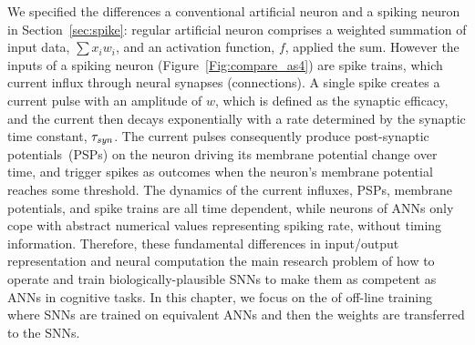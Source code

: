 	We \DIFdelbegin {}\DIFdelend specified the differences \DIFdelbegin {}\DIFdelend \DIFaddbegin {}\DIFaddend a conventional artificial neuron and a spiking neuron in Section~\ref{sec:spike}: \DIFaddbegin {}\DIFaddend regular artificial neuron comprises a weighted summation of input data, $\sum x_i w_i$, and an activation function, $f$, applied \DIFdelbegin {}\DIFdelend \DIFaddbegin {}\DIFaddend the sum.
	However the inputs of a spiking neuron (Figure~\ref{Fig:compare_as4}) are spike trains, which \DIFdelbegin {}\DIFdelend \DIFaddbegin {}\DIFaddend current influx through neural synapses (connections).
	A single spike creates a current pulse with an amplitude of $w$, which is defined as the synaptic efficacy, and the current then decays exponentially with a \DIFdelbegin {}\DIFdelend \DIFaddbegin {}\DIFaddend rate determined by the synaptic time constant, $\tau_{\textit{\textrm{syn}}}$.
	The current pulses \DIFdelbegin {}\DIFdelend consequently produce post-synaptic potentials~(PSPs) on the neuron driving its membrane potential \DIFaddbegin {}\DIFaddend change over time, and trigger spikes as outcomes when the neuron's membrane potential reaches some threshold.
	The dynamics of the current influxes, PSPs, membrane potentials, and spike trains are all time dependent, while \DIFaddbegin {}\DIFaddend neurons of ANNs only cope with abstract numerical values representing spiking rate, without timing information.
	Therefore, these fundamental differences in input/output representation and neural computation \DIFdelbegin {}\DIFdelend \DIFaddbegin {}\DIFaddend the main research problem of how to operate and train biologically-plausible SNNs to make them as competent as ANNs in cognitive tasks.
	In this chapter, we focus on the \DIFdelbegin {}\DIFdelend \DIFaddbegin {}\DIFaddend of off-line \DIFdelbegin {}\DIFdelend training where SNNs are trained on equivalent ANNs and then the \DIFdelbegin {}\DIFdelend \DIFaddbegin {}\DIFaddend weights are transferred to the SNNs.

